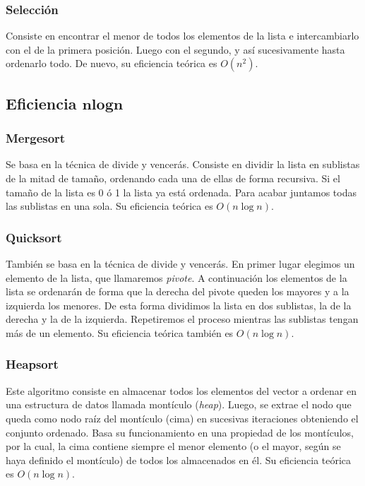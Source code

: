 \documentclass[11pt]{article}
\begin{document}
\subsubsection*{Selección}
Consiste en encontrar el menor de todos los elementos de la lista e intercambiarlo con el de la primera posición. Luego con el segundo, y así sucesivamente hasta ordenarlo todo. De nuevo, su eficiencia teórica es $O(n^2)$.
\begin{center}
	
\end{center}

\subsection*{Eficiencia $\boldsymbol{n log n}$}
\subsubsection*{Mergesort}
Se basa en la técnica de divide y vencerás. Consiste en dividir la lista en sublistas de la mitad de tamaño, ordenando cada una de ellas de forma recursiva. Si el tamaño de la lista es 0 ó 1 la lista ya está ordenada. Para acabar juntamos todas las sublistas en una sola. Su eficiencia teórica es $O(n\log n)$.

\begin{center}
	
\end{center}

\subsubsection*{Quicksort}
También se basa en la técnica de divide y vencerás.
En primer lugar elegimos un elemento de la lista, que llamaremos \textit{pivote}. A continuación los elementos de la lista se ordenarán de forma que la derecha del pivote queden los mayores y a la izquierda los menores. De esta forma dividimos la lista en dos sublistas, la de la derecha y la de la izquierda. Repetiremos el proceso mientras las sublistas tengan más de un elemento. Su eficiencia teórica también es $O(n\log n)$.

\begin{center}
	
\end{center}

\subsubsection*{Heapsort}
Este algoritmo consiste en almacenar todos los elementos del vector a ordenar en una estructura de datos llamada montículo (\textit{heap}). Luego, se extrae el nodo que queda como nodo raíz del montículo (cima) en sucesivas iteraciones obteniendo el conjunto ordenado. Basa su funcionamiento en una propiedad de los montículos, por la cual, la cima contiene siempre el menor elemento (o el mayor, según se haya definido el montículo) de todos los almacenados en él. Su eficiencia teórica es $O(n\log n)$.
\begin{center}
	
\end{center}
\end{document}
